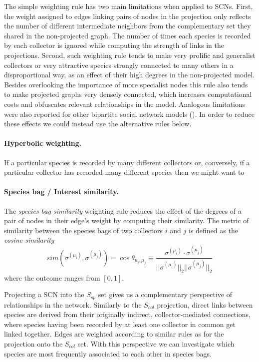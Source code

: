 \documentclass[a4paper]{article}
\begin{document}
The simple weighting rule has two main limitations when applied to SCNs.
First, the weight assigned to edges linking pairs of nodes in the projection only reflects the number of different intermediate neighbors from the complementary set they shared in the non-projected graph. The number of times each species is recorded by each collector is ignored while computing the strength of links in the projections.
Second, such weighting rule tends to make very prolific and generalist collectors or very attractive species strongly connected to many others in a disproportional way, as an effect of their high degrees in the non-projected model. Besides overlooking the importance of more specialist nodes this rule also tends to make projected graphs very densely connected, which increases computational costs and obfuscates relevant relationships in the model. Analogous limitations were also reported for other bipartite social network models (\cite{Lambiotte2005}).
In order to reduce these effects we could instead use the alternative rules below.

\paragraph{Hyperbolic weighting.}
If a particular species is recorded by many different collectors or, conversely, if a particular collector has recorded many different species then we might want to

\paragraph{Species bag / Interest similarity.}
The \textit{species bag similarity} weighting rule reduces the effect of the degrees of a pair of nodes in their edge's weight by computing their similarity.
The metric of similarity between the species bags of two collectors $i$ and $j$ is defined as the \textit{cosine similarity}
$$
sim(\sigma^{(\mu_i)},\sigma^{(\mu_j)}) =
\cos \theta_{\mu_i,\mu_j} \equiv
\frac{  \sigma^{(\mu_i)} \cdot \sigma^{(\mu_j)}  }{  ||\sigma^{(\mu_i)}||_2  ||\sigma^{(\mu_j)}||_2  }
$$
where the outcome ranges from $[0,1]$. %

Projecting a SCN into the $S_{sp}$ set gives us a complementary perspective of relationships in the network.
Similarly to the $S_{col}$ projection, direct links between species are derived from their originally indirect, collector-mediated connections, where species having been recorded by at least one collector in common get linked together.
Edges are weighted according to similar rules as for the projection onto the $S_{col}$ set.
With this perspective we can investigate which species are most frequently associated to each other in species bags.%
\end{document}
